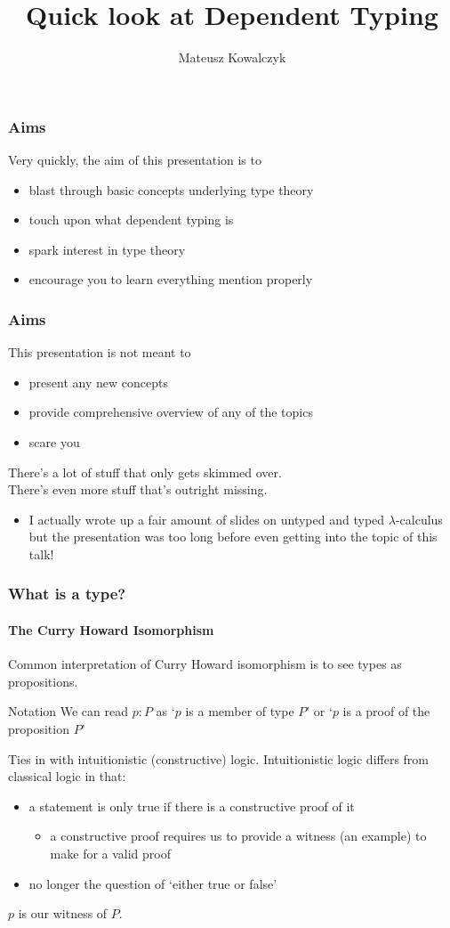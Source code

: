 \documentclass{beamer}
\title[Dependent Types]{Quick look at Dependent Typing}
\author{Mateusz Kowalczyk}
\institute{University of Bath}
\begin{document}
\begin{frame}
  \titlepage
\end{frame}
\begin{frame}
  \frametitle{Aims}
  Very quickly, the aim of this presentation is to
  \pause
  \begin{itemize}[<+->]
    \item blast through basic concepts underlying type theory
    \item touch upon what dependent typing is
    \item spark interest in type theory
    \item encourage you to learn everything mention properly
    \end{itemize}
\end{frame}
\begin{frame}
  \frametitle{Aims}
  This presentation is not meant to
  \pause
  \begin{itemize}[<+->]
    \item present any new concepts
    \item provide comprehensive overview of any of the topics
    \item scare you
  \end{itemize}
  \pause
  There's a lot of stuff that only gets skimmed over.\\
  There's even more stuff that's outright missing.\\
  \pause
  \begin{itemize}
    \item I actually wrote up a fair amount of slides on untyped and
      typed $\lambda$-calculus but the presentation was too long
      before even getting into the topic of this talk!
  \end{itemize}
\end{frame}
\begin{frame}
  \frametitle{What is a type?}
  \framesubtitle{The Curry Howard Isomorphism}
  Common interpretation of Curry Howard isomorphism is to see types as
  propositions.
  \pause
  \begin{exampleblock}{Notation}
    We can read $p:P$ as `$p$ is a member of type $P$' or `$p$ is a proof of the
    proposition $P$'
  \end{exampleblock}
  \pause
  Ties in with intuitionistic (constructive) logic. Intuitionistic
  logic differs from classical logic in that:
  \pause
  \begin{itemize}[<+->]
    \item a statement is only true if there is a constructive proof of
      it
    \begin{itemize}
      \item a constructive proof requires us to provide a witness
          (an example) to make for a valid proof
    \end{itemize}
    \item no longer the question of `either true or false'
  \end{itemize}
  \pause
  $p$ is our witness of $P$.
\end{frame}
\end{document}
